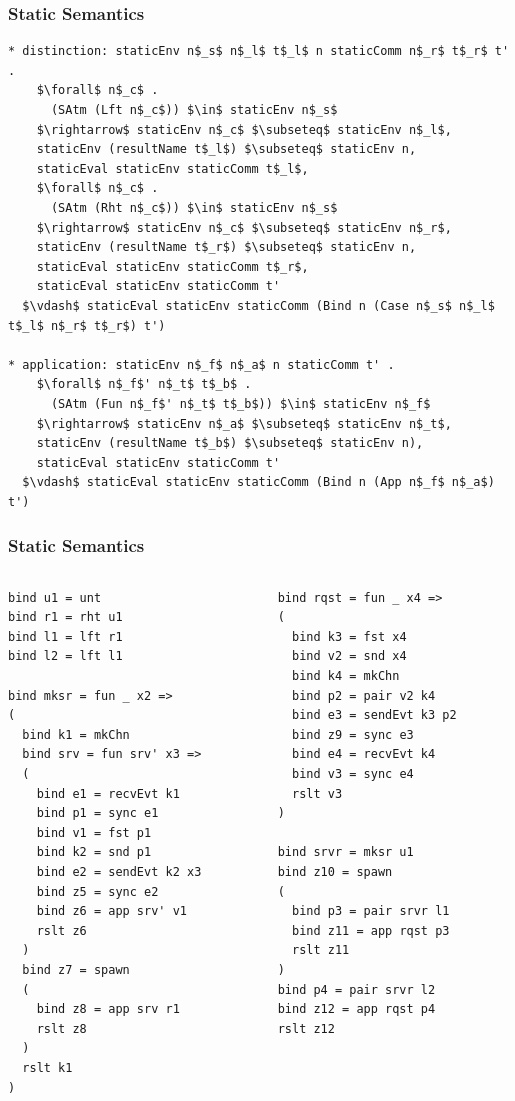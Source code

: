 \documentclass{beamer}
\begin{document}
\begin{frame}[fragile]
	\frametitle{Static Semantics}
\begin{lstlisting}[language=logic, mathescape]
* distinction: staticEnv n$_s$ n$_l$ t$_l$ n staticComm n$_r$ t$_r$ t' . 
    $\forall$ n$_c$ . 
      (SAtm (Lft n$_c$)) $\in$ staticEnv n$_s$
    $\rightarrow$ staticEnv n$_c$ $\subseteq$ staticEnv n$_l$,
    staticEnv (resultName t$_l$) $\subseteq$ staticEnv n,
    staticEval staticEnv staticComm t$_l$,
    $\forall$ n$_c$ . 
      (SAtm (Rht n$_c$)) $\in$ staticEnv n$_s$
    $\rightarrow$ staticEnv n$_c$ $\subseteq$ staticEnv n$_r$, 
    staticEnv (resultName t$_r$) $\subseteq$ staticEnv n, 
    staticEval staticEnv staticComm t$_r$,
    staticEval staticEnv staticComm t'
  $\vdash$ staticEval staticEnv staticComm (Bind n (Case n$_s$ n$_l$ t$_l$ n$_r$ t$_r$) t')

* application: staticEnv n$_f$ n$_a$ n staticComm t' . 
    $\forall$ n$_f$' n$_t$ t$_b$ . 
      (SAtm (Fun n$_f$' n$_t$ t$_b$)) $\in$ staticEnv n$_f$
    $\rightarrow$ staticEnv n$_a$ $\subseteq$ staticEnv n$_t$, 
    staticEnv (resultName t$_b$) $\subseteq$ staticEnv n),
    staticEval staticEnv staticComm t'
  $\vdash$ staticEval staticEnv staticComm (Bind n (App n$_f$ n$_a$) t')
\end{lstlisting}
\end{frame}

\begin{frame}[fragile]
	\frametitle{Static Semantics}
\begin{columns}
\begin{column}{0.5\textwidth}
\begin{lstlisting}[language=normal_lang, mathescape]
bind u1 = unt
bind r1 = rht u1
bind l1 = lft r1
bind l2 = lft l1

bind mksr = fun _ x2 => 
(
  bind k1 = mkChn
  bind srv = fun srv' x3 =>
  (
    bind e1 = recvEvt k1
    bind p1 = sync e1
    bind v1 = fst p1
    bind k2 = snd p1 
    bind e2 = sendEvt k2 x3
    bind z5 = sync e2
    bind z6 = app srv' v1
    rslt z6 
  )
  bind z7 = spawn
  (
    bind z8 = app srv r1
    rslt z8 
  )
  rslt k1
)
\end{lstlisting}
\end{column}

\begin{column}{0.5\textwidth}
\begin{lstlisting}[language=normal_lang, mathescape]
bind rqst = fun _ x4 =>
(
  bind k3 = fst x4
  bind v2 = snd x4
  bind k4 = mkChn
  bind p2 = pair v2 k4
  bind e3 = sendEvt k3 p2
  bind z9 = sync e3
  bind e4 = recvEvt k4
  bind v3 = sync e4
  rslt v3
)

bind srvr = mksr u1
bind z10 = spawn
( 
  bind p3 = pair srvr l1
  bind z11 = app rqst p3
  rslt z11
)
bind p4 = pair srvr l2
bind z12 = app rqst p4
rslt z12
\end{lstlisting}
\end{column}
\end{columns}
\end{frame}
\end{document}
